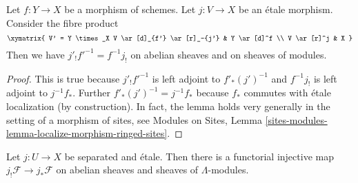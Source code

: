 \begin{lemma}
\label{lemma-shriek-base-change}
Let $f: Y \to X$ be a morphism of schemes. Let $j: V \to X$ be an \'etale
morphism. Consider the fibre product
$$
\xymatrix{
V' = Y \times_X V \ar[d]_{f'} \ar[r]_-{j'} & Y \ar[d]^f \\
V \ar[r]^j & X
}
$$
Then we have $j'_! f'^{-1} = f^{-1} j_!$ on abelian sheaves and on
sheaves of modules.
\end{lemma}

\begin{proof}
This is true because $j'_! f'^{-1}$ is left adjoint to
$f'_* (j')^{-1}$ and $f^{-1} j_!$ is left adjoint to $j^{-1}f_*$.
Further $f'_* (j')^{-1} = j^{-1}f_*$ because $f_*$ commutes with
\'etale localization (by construction). In fact, the lemma holds very generally
in the setting of a morphism of sites, see
Modules on Sites, Lemma
\ref{sites-modules-lemma-localize-morphism-ringed-sites}.
\end{proof}

\begin{lemma}
\label{lemma-shriek-into-star-separated-etale}
Let $j : U \to X$ be separated and \'etale. Then there is a functorial
injective map $j_!\mathcal{F} \to j_*\mathcal{F}$
on abelian sheaves and sheaves of $\Lambda$-modules.
\end{lemma}

